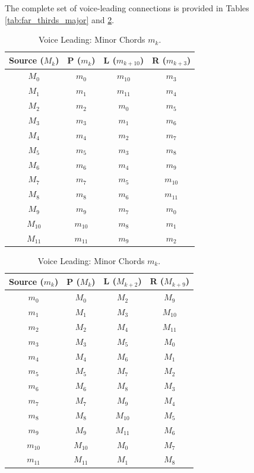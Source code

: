 \documentclass[12pt,letterpaper]{amsart}
\begin{document}
The complete set of voice-leading connections is provided in Tables \ref{tab:far_thirds_major} and \ref{tab:far_thirds_minor}.

\begin{table}[H]
\centering
\scriptsize
\renewcommand{\arraystretch}{1.2}
\begin{minipage}{0.48\textwidth}
\centering
\begin{tabular}{|c||c|c|c|}
\hline
\textbf{Source} ($M_k$) & \textbf{P} ($m_k$) & \textbf{L} ($m_{k+10}$) & \textbf{R} ($m_{k+3}$) \\
\hline
$M_0$ & $m_0$ & $m_{10}$ & $m_3$ \\
$M_1$ & $m_1$ & $m_{11}$ & $m_4$ \\
$M_2$ & $m_2$ & $m_{0}$ & $m_5$ \\
$M_3$ & $m_3$ & $m_{1}$ & $m_6$ \\
$M_4$ & $m_4$ & $m_{2}$ & $m_7$ \\
$M_5$ & $m_5$ & $m_{3}$ & $m_8$ \\
$M_6$ & $m_6$ & $m_{4}$ & $m_9$ \\
$M_7$ & $m_7$ & $m_{5}$ & $m_{10}$ \\
$M_8$ & $m_8$ & $m_{6}$ & $m_{11}$ \\
$M_9$ & $m_9$ & $m_{7}$ & $m_{0}$ \\
$M_{10}$ & $m_{10}$ & $m_{8}$ & $m_{1}$ \\
$M_{11}$ & $m_{11}$ & $m_{9}$ & $m_{2}$ \\
\hline
\end{tabular}
\caption{Voice Leading: Major Chords $M_k$.}
\label{tab:far_thirds_major}
\end{minipage}
\hfill
\begin{minipage}{0.48\textwidth}
\centering
\begin{tabular}{|c||c|c|c|}
\hline
\textbf{Source} ($m_k$) & \textbf{P} ($M_k$) & \textbf{L} ($M_{k+2}$) & \textbf{R} ($M_{k+9}$) \\
\hline
$m_0$ & $M_0$ & $M_2$ & $M_9$ \\
$m_1$ & $M_1$ & $M_3$ & $M_{10}$ \\
$m_2$ & $M_2$ & $M_4$ & $M_{11}$ \\
$m_3$ & $M_3$ & $M_5$ & $M_{0}$ \\
$m_4$ & $M_4$ & $M_6$ & $M_{1}$ \\
$m_5$ & $M_5$ & $M_7$ & $M_{2}$ \\
$m_6$ & $M_6$ & $M_8$ & $M_{3}$ \\
$m_7$ & $M_7$ & $M_9$ & $M_{4}$ \\
$m_8$ & $M_8$ & $M_{10}$ & $M_{5}$ \\
$m_9$ & $M_9$ & $M_{11}$ & $M_{6}$ \\
$m_{10}$ & $M_{10}$ & $M_{0}$ & $M_{7}$ \\
$m_{11}$ & $M_{11}$ & $M_{1}$ & $M_{8}$ \\
\hline
\end{tabular}
\caption{Voice Leading: Minor Chords $m_k$.}
\label{tab:far_thirds_minor}
\end{minipage}
\end{table}
\end{document}
